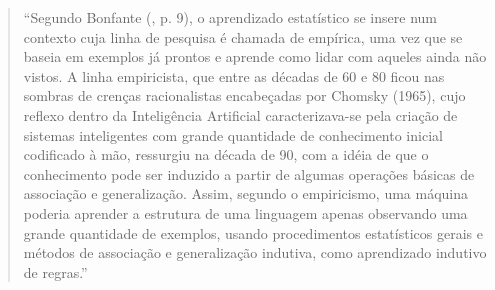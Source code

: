 \begin{quotation}
\footnotesize
``Segundo Bonfante (\cite{bonfante03}, p. 9), o aprendizado estatístico se insere num contexto cuja linha de pesquisa é chamada de empírica, uma vez que se baseia em exemplos já prontos e aprende como lidar com aqueles ainda não vistos. A linha empiricista, que entre as décadas de 60 e 80 ficou nas sombras de crenças racionalistas encabeçadas por Chomsky (1965), cujo reflexo dentro da Inteligência Artificial caracterizava-se pela criação de sistemas inteligentes com grande quantidade de conhecimento inicial codificado à mão, ressurgiu na década de 90, com a idéia de que o conhecimento pode ser induzido a partir de algumas operações básicas de associação e generalização. Assim, segundo o empiricismo, uma máquina poderia aprender a estrutura de uma linguagem apenas observando uma grande quantidade de exemplos, usando procedimentos estatísticos gerais e métodos de associação e generalização indutiva, como aprendizado indutivo de regras.''
\end{quotation}


